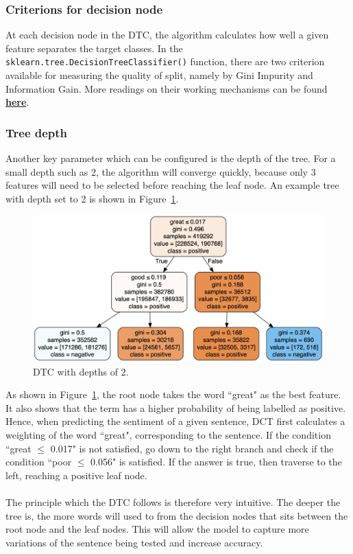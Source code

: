 \documentclass[a4paper]{report}
\newcommand{\code}[1]{\texttt{#1}}
\begin{document}
{{\subsubsection{Criterions for decision node}
At each decision node in the DTC, the algorithm calculates how well a given feature separates the target classes. In the \code{sklearn.tree.DecisionTreeClassifier()} function, there are two criterion available for measuring the quality of split, namely by Gini Impurity and Information Gain. More readings on their working mechanisms can be found \href{https://en.wikipedia.org/wiki/Decision_tree_learning}{\textbf{here}}.

\subsubsection{Tree depth}
Another key parameter which can be configured is the depth of the tree. For a small depth such as 2, the algorithm will converge quickly, because only 3 features will need to be selected before reaching the leaf node. An example tree with depth set to 2 is shown in Figure~\ref{Figure:DTC_depth_2}.
\\
\begin{figure}[h]
\centering
\includegraphics[width=\columnwidth]{Figure_1_DTC_depth_2.png}
\caption{DTC with depths of 2.}
\label{Figure:DTC_depth_2}
\end{figure}

\noindent
As shown in Figure~\ref{Figure:DTC_depth_2}, the root node takes the word “great" as the best feature. It also shows that the term has a higher probability of being labelled as positive. Hence, when predicting the sentiment of a given sentence, DCT first calculates a weighting of the word “great", corresponding to the sentence. If the condition “great \( \leq\) 0.017" is not satisfied, go down to the right branch and check if the condition “poor \(\leq\) 0.056" is satisfied. If the answer is true, then traverse to the left, reaching a positive leaf node.
\\\\
The principle which the DTC follows is therefore very intuitive. The deeper the tree is, the more words will used to from the decision nodes that sits between the root node and the leaf nodes. This will allow the model to capture more variations of the sentence being tested and increase accuracy.

}}
\end{document}
